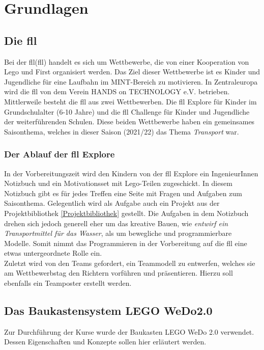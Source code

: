 \chapter{Grundlagen}

\section{Die \acrlong{fll}}
Bei der \acrlong{fll}(\acrshort{fll}) handelt es sich um Wettbewerbe, die von einer Kooperation von \gls{Lego} und \gls{First} organisiert werden. Das Ziel dieser Wettbewerbe ist es Kinder und Jugendliche für eine Laufbahn im \gls{MINT}-Bereich zu motivieren. In Zentraleuropa wird die \acrshort{fll} von dem Verein HANDS on TECHNOLOGY e.V. betrieben.\\
Mittlerweile besteht die \acrshort{fll} aus zwei Wettbewerben. Die \acrlong{fll} Explore für Kinder im Grundschulalter (6-10 Jahre) und die \acrlong{fll} Challenge für Kinder und Jugendliche der weiterführenden Schulen. Diese beiden Wettbewerbe haben ein gemeinsames Saisonthema, welches in dieser Saison (2021/22) das Thema \textit{Transport} war.\\

\subsection{Der Ablauf der \acrshort{fll} Explore} \label{preparation}
In der Vorbereitungszeit wird den Kindern von der \acrshort{fll} Explore ein IngenieurInnen Notizbuch und ein Motivationsset mit \gls{Lego}-Teilen zugeschickt. In diesem Notizbuch gibt es für jedes Treffen eine Seite mit Fragen und Aufgaben zum Saisonthema. Gelegentlich wird als Aufgabe auch ein Projekt aus der Projektbibliothek \ref{Projektbibliothek} gestellt. Die Aufgaben in dem Notizbuch drehen sich jedoch generell eher um das kreative Bauen, wie \textit{entwirf ein Transportmittel für das Wasser}, als um bewegliche und programmierbare Modelle. Somit nimmt das Programmieren in der Vorbereitung auf die \acrshort{fll} eine etwas untergeordnete Rolle ein.\\
Zuletzt wird von den Teams gefordert, ein Teammodell zu entwerfen, welches sie am Wettbewerbstag den Richtern vorführen und präsentieren. Hierzu soll ebenfalls ein Teamposter erstellt werden.


\section{Das Baukastensystem LEGO WeDo2.0} \label{Wedo}
Zur Durchführung der Kurse wurde der Baukasten LEGO WeDo 2.0 verwendet. Dessen Eigenschaften und Konzepte sollen hier erläutert werden.
